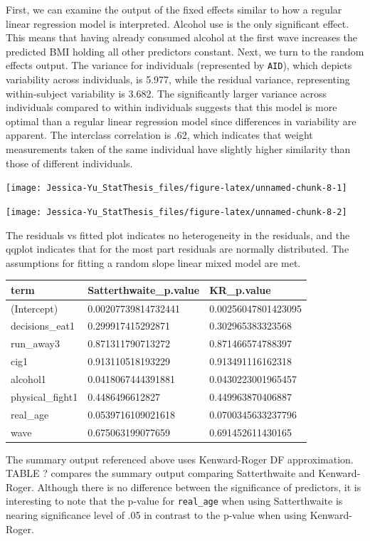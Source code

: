 \documentclass[12pt, twoside]{amherstthesis}
\begin{document}
First, we can examine the output of the fixed effects similar to how a regular linear regression model is interpreted. Alcohol use is the only significant effect. This means that having already consumed alcohol at the first wave increases the predicted BMI holding all other predictors constant. Next, we turn to the random effects output. The variance for individuals (represented by \texttt{AID}), which depicts variability across individuals, is 5.977, while the residual variance, representing within-subject variability is 3.682. The significantly larger variance across individuals compared to within individuals suggests that this model is more optimal than a regular linear regression model since differences in variability are apparent. The interclass correlation is .62, which indicates that weight measurements taken of the same individual have slightly higher similarity than those of different individuals.
\begin{center}\texttt{[image: Jessica-Yu\_StatThesis\_files/figure-latex/unnamed-chunk-8-1]} \end{center}
\begin{center}\texttt{[image: Jessica-Yu\_StatThesis\_files/figure-latex/unnamed-chunk-8-2]} \end{center}

The residuals vs fitted plot indicates no heterogeneity in the residuals, and the qqplot indicates that for the most part residuals are normally distributed. The assumptions for fitting a random slope linear mixed model are met.
\begin{tabular}{l|l|l}
\hline
term & Satterthwaite\_p.value & KR\_p.value\\
\hline
(Intercept) & 0.00207739814732441 & 0.00256047801423095\\
\hline
decisions\_eat1 & 0.299917415292871 & 0.302965383323568\\
\hline
run\_away3 & 0.871311790713272 & 0.871466574788397\\
\hline
cig1 & 0.913110518193229 & 0.913491116162318\\
\hline
alcohol1 & 0.0418067444391881 & 0.0430223001965457\\
\hline
physical\_fight1 & 0.4486496612827 & 0.449963870406887\\
\hline
real\_age & 0.0539716109021618 & 0.0700345633237796\\
\hline
wave & 0.675063199077659 & 0.691452611430165\\
\hline
\end{tabular}
The summary output referenced above uses Kenward-Roger DF approximation. TABLE ? compares the summary output comparing Satterthwaite and Kenward-Roger. Although there is no difference between the significance of predictors, it is interesting to note that the p-value for \texttt{real\_age} when using Satterthwaite is nearing significance level of .05 in contrast to the p-value when using Kenward-Roger.
\end{document}
